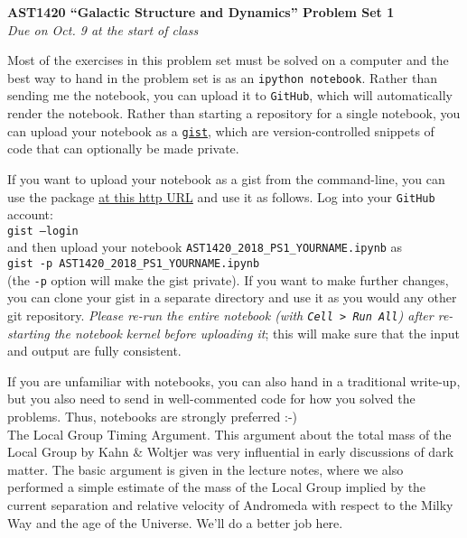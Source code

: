 \documentclass[12pt]{article}
\begin{document}
\begin{center}
{\bf \LARGE AST1420 ``Galactic Structure and Dynamics'' Problem Set 1}\\[7pt]
\emph{Due on Oct. 9 at the start of class}\\[7pt]
\end{center}

Most of the exercises in this problem set must be solved on a computer
and the best way to hand in the problem set is as an \texttt{ipython
  notebook}. Rather than sending me the notebook, you can upload it to
\texttt{GitHub}, which will automatically render the notebook. Rather
than starting a repository for a single notebook, you can upload your
notebook as a \texttt{\href{https://gist.github.com/}{gist}}, which
are version-controlled snippets of code that can optionally be made
private.

If you want to upload your notebook as a gist from the command-line,
you can use the package \href{http://github.com/defunkt/gist}{at this
  http URL} and use it as follows. Log into your \texttt{GitHub}
account:\\

\texttt{gist --login}\\

and then upload your notebook
\texttt{AST1420\_2018\_PS1\_YOURNAME.ipynb} as\\

\texttt{gist -p AST1420\_2018\_PS1\_YOURNAME.ipynb}\\

(the \texttt{-p} option will make the gist private). If you want to
make further changes, you can clone your gist in a separate directory
and use it as you would any other git repository. \emph{Please re-run
  the entire notebook (with \texttt{Cell > Run All}) after re-starting
  the notebook kernel before uploading it}; this will make sure that
the input and output are fully consistent.

If you are unfamiliar with notebooks, you can also hand in a
traditional write-up, but you also need to send in well-commented code
for how you solved the problems. Thus, notebooks are strongly preferred :-)\\

 The Local Group Timing Argument. This
argument about the total mass of the Local Group by Kahn \& Woltjer
was very influential in early discussions of dark matter. The basic
argument is given in the lecture notes, where we also performed a
simple estimate of the mass of the Local Group implied by the current
separation and relative velocity of Andromeda with respect to the
Milky Way and the age of the Universe. We'll do a better job here.\\
\end{document}
